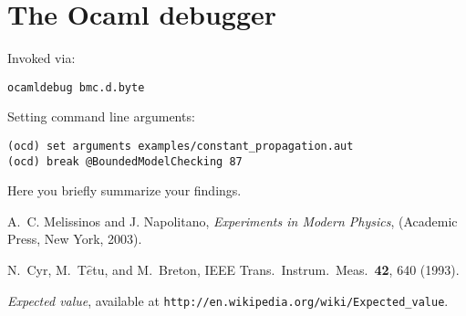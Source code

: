 \documentclass[letterpaper,12pt]{article}
\begin{document}
\section{The Ocaml debugger}
Invoked via:
\begin{verbatim}
ocamldebug bmc.d.byte
\end{verbatim}
Setting command line arguments:
\begin{verbatim}
(ocd) set arguments examples/constant_propagation.aut
(ocd) break @BoundedModelChecking 87
\end{verbatim}




Here you briefly summarize your findings.


\begin{thebibliography}{99}

A.~C. Melissinos and J. Napolitano, \textit{Experiments in Modern Physics},
(Academic Press, New York, 2003).

N.\ Cyr, M.\ T$\hat{e}$tu, and M.\ Breton,
IEEE Trans.\ Instrum.\ Meas.\ \textbf{42}, 640 (1993).

 \emph{Expected value},  available at
\texttt{http://en.wikipedia.org/wiki/Expected\_value}.

\end{thebibliography}
\end{document}
